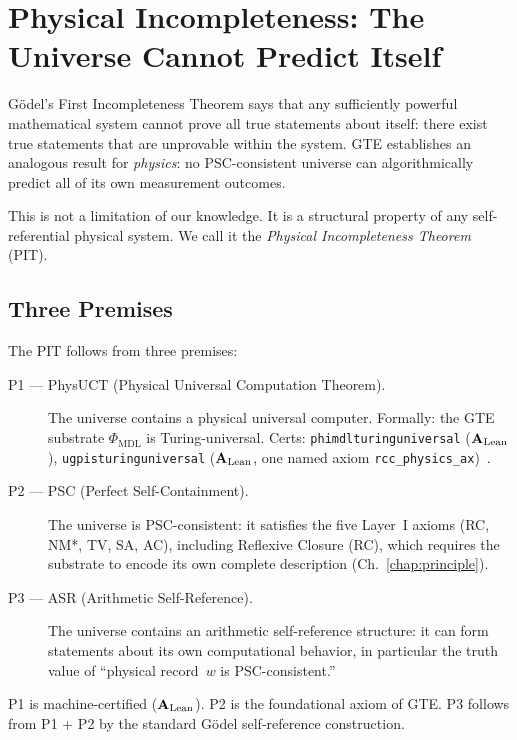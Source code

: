 \documentclass[11pt,openany]{book}
\theoremstyle{remark}
\newcommand{\MDL}{\text{MDL}}
\newcommand{\lean}[1]{%
  \penalty-100
  \begingroup\def\_{\textunderscore\allowbreak}\texttt{#1}\endgroup}
\newcommand{\CatAL}{\ensuremath{\textbf{A}_{\rm Lean}}}
\begin{document}
\section{Physical Incompleteness: The Universe Cannot Predict Itself}
\label{sec:pit}

G\"{o}del's First Incompleteness Theorem says that any sufficiently powerful mathematical
system cannot prove all true statements about itself: there exist true statements that
are unprovable within the system.  GTE establishes an analogous result for \emph{physics}:
no PSC-consistent universe can algorithmically predict all of its own measurement outcomes.

This is not a limitation of our knowledge.  It is a structural property of any
self-referential physical system.  We call it the \emph{Physical Incompleteness Theorem}
(PIT).

\subsection*{Three Premises}

The PIT follows from three premises:

\begin{description}
\item[P1 --- PhysUCT (Physical Universal Computation Theorem).]
  The universe contains a physical universal computer.  Formally: the GTE substrate
  $\Phi_{\MDL}$ is Turing-universal.  Certs: \lean{phimdl\_turing\_universal} (\CatAL),
  \lean{ugp\_is\_turing\_universal} (\CatAL, one named axiom
  \texttt{rcc\_physics\_ax})~\cite{SpivackGTEMobius}.

\item[P2 --- PSC (Perfect Self-Containment).]
  The universe is PSC-consistent: it satisfies the five Layer~I axioms
  (RC, NM*, TV, SA, AC), including Reflexive Closure (RC), which requires the substrate
  to encode its own complete description (Ch.~\ref{chap:principle}).

\item[P3 --- ASR (Arithmetic Self-Reference).]
  The universe contains an arithmetic self-reference structure: it can form statements
  about its own computational behavior, in particular the truth value of
  ``physical record~$w$ is PSC-consistent.''
\end{description}

P1 is machine-certified (\CatAL).  P2 is the foundational axiom of GTE.  P3 follows
from P1 + P2 by the standard G\"{o}del self-reference construction.
\end{document}
